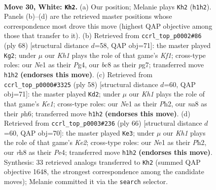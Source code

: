 \documentclass[11pt]{article}
\begin{document}
\clearpage

\begin{figure}[p]\centering
\begin{subfigure}{0.46\textwidth}\centering
\resizebox{\linewidth}{!}{%
\newchessgame
\chessboard[
  setfen={n1b4r/1p4k1/8/6pp/1Q6/P2P1P2/8/4Nq1K w - - 0 30},
  showmover=false,
  pgfstyle=straightmove, color=movearrow, markmove={h1-h2}
]}
\caption{}
\end{subfigure}\hfill
\begin{subfigure}{0.46\textwidth}\centering
\resizebox{\linewidth}{!}{%
\newchessgame
\chessboard[
  setfen={7k/1p4p1/1p5p/7P/P3Q1P1/8/5P2/3q1K2 w - - 4 35},
  showmover=false,
  pgfstyle=straightmove, color=movearrow, markmove={f1-g2}
]}
\caption{}
\end{subfigure}
\\[4pt]
\begin{subfigure}{0.46\textwidth}\centering
\resizebox{\linewidth}{!}{%
\newchessgame
\chessboard[
  setfen={7k/8/1p3p1p/2p5/P7/5QP1/4P2P/4K1q1 w - - 4 30},
  showmover=false,
  pgfstyle=straightmove, color=movearrow, markmove={e1-d2}
]}
\caption{}
\end{subfigure}\hfill
\begin{subfigure}{0.46\textwidth}\centering
\resizebox{\linewidth}{!}{%
\newchessgame
\chessboard[
  setfen={8/pp4k1/4Q1p1/3P3p/4P3/8/2q1K2P/8 w - - 4 34},
  showmover=false,
  pgfstyle=straightmove, color=movearrow, markmove={e2-e3}
]}
\caption{}
\end{subfigure}
\caption{\textbf{Move 30, White: \texttt{Kh2}.} (a) Our position; Melanie plays \texttt{Kh2} (\texttt{h1h2}). Panels (b)--(d) are the retrieved master positions whose correspondence most drove this move (highest QAP objective among those that transfer to it). (b) Retrieved from \texttt{ccrl\_top\_p0002\#86} (ply 68) [structural distance $d$=58, QAP obj=71]: the master played \texttt{Kg2}; under $\mu$ our \emph{Kh1} plays the role of that game's \emph{Kf1}; cross-type roles: our \emph{N}e1 as their \emph{P}g4, our \emph{b}c8 as their \emph{p}g7; transferred move \texttt{h1h2} \textbf{(endorses this move)}. (c) Retrieved from \texttt{ccrl\_top\_p0000\#3325} (ply 58) [structural distance $d$=60, QAP obj=71]: the master played \texttt{Kd2}; under $\mu$ our \emph{Kh1} plays the role of that game's \emph{Ke1}; cross-type roles: our \emph{N}e1 as their \emph{P}h2, our \emph{n}a8 as their \emph{p}h6; transferred move \texttt{h1h2} \textbf{(endorses this move)}. (d) Retrieved from \texttt{ccrl\_top\_p0003\#236} (ply 66) [structural distance $d$=60, QAP obj=70]: the master played \texttt{Ke3}; under $\mu$ our \emph{Kh1} plays the role of that game's \emph{Ke2}; cross-type roles: our \emph{N}e1 as their \emph{P}h2, our \emph{r}h8 as their \emph{P}e4; transferred move \texttt{h1h2} \textbf{(endorses this move)}. Synthesis: 33 retrieved analogs transferred to \texttt{Kh2} (summed QAP objective 1648, the strongest correspondence among the candidate moves); Melanie committed it via the \texttt{search} selector.}
\label{fig:thought-m58}
\end{figure}
\end{document}
